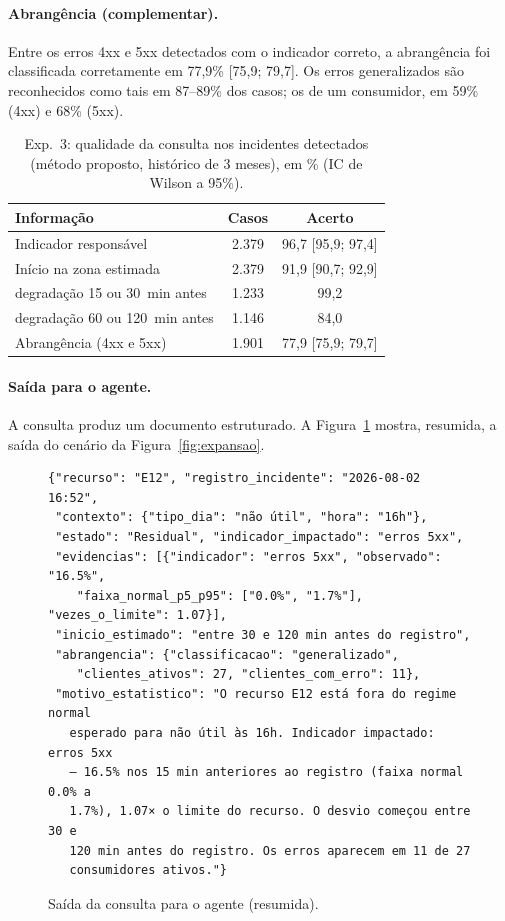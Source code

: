 \documentclass[sigconf,nonacm]{acmart}
\begin{document}
\paragraph{Abrangência (complementar).} Entre os erros 4xx e 5xx detectados com o indicador correto, a abrangência foi classificada corretamente em 77,9\% [75,9; 79,7]. Os erros generalizados são reconhecidos como tais em 87--89\% dos casos; os de um consumidor, em 59\% (4xx) e 68\% (5xx).

\begin{table}[t]
  \caption{Exp.~3: qualidade da consulta nos incidentes detectados (método proposto, histórico de 3 meses), em \% (IC de Wilson a 95\%).}
  \label{tab:consulta}
  \small
  \begin{tabular}{lcc}
    \toprule
    Informação & Casos & Acerto \\
    \midrule
    Indicador responsável & 2.379 & 96,7 [95,9; 97,4] \\
    Início na zona estimada & 2.379 & 91,9 [90,7; 92,9] \\
    \quad degradação 15 ou 30~min antes & 1.233 & 99,2 \\
    \quad degradação 60 ou 120~min antes & 1.146 & 84,0 \\
    Abrangência (4xx e 5xx) & 1.901 & 77,9 [75,9; 79,7] \\
    \bottomrule
  \end{tabular}
\end{table}

\paragraph{Saída para o agente.} A consulta produz um documento estruturado. A Figura~\ref{fig:json} mostra, resumida, a saída do cenário da Figura~\ref{fig:expansao}.

\begin{figure}[t]
\begin{Verbatim}[fontsize=\scriptsize,frame=single]
{"recurso": "E12", "registro_incidente": "2026-08-02 16:52",
 "contexto": {"tipo_dia": "não útil", "hora": "16h"},
 "estado": "Residual", "indicador_impactado": "erros 5xx",
 "evidencias": [{"indicador": "erros 5xx", "observado": "16.5%",
    "faixa_normal_p5_p95": ["0.0%", "1.7%"], "vezes_o_limite": 1.07}],
 "inicio_estimado": "entre 30 e 120 min antes do registro",
 "abrangencia": {"classificacao": "generalizado",
    "clientes_ativos": 27, "clientes_com_erro": 11},
 "motivo_estatistico": "O recurso E12 está fora do regime normal
   esperado para não útil às 16h. Indicador impactado: erros 5xx
   — 16.5% nos 15 min anteriores ao registro (faixa normal 0.0% a
   1.7%), 1.07× o limite do recurso. O desvio começou entre 30 e
   120 min antes do registro. Os erros aparecem em 11 de 27
   consumidores ativos."}
\end{Verbatim}
\caption{Saída da consulta para o agente (resumida).}
\label{fig:json}
\end{figure}
\end{document}
